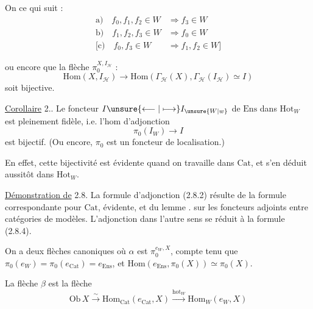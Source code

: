 On  ce qui suit :
\[
\begin{aligned}
\text{a)}\quad f_0,f_1,f_2\in W &\Longrightarrow f_3\in W\\
\text{b)}\quad f_1,f_2,f_3\in W &\Longrightarrow f_0\in W\\
\bigl[\text{c)}\quad f_0,f_3\in W &\Longrightarrow f_1,f_2\in W\bigr]
\end{aligned}
\]

ou encore que la flèche $\pi_0^{X,I_{\mathcal H}}$ :
\[
\mathrm{Hom}(X,I_{\mathcal H})\longrightarrow\mathrm{Hom}(\Gamma_{\mathcal H}(X),\Gamma_{\mathcal H}(I_{\mathcal H})\simeq I)
\]
soit bijective.

\uline{Corollaire} 2..  Le foncteur $I\unsure{\longleftarrow|\longmapsto}I_{\unsure{W|w}}$ de $\mathrm{Ens}$ dans $\mathrm{Hot}_W$ est pleinement fidèle, i.e. l'hom d'adjonction
\[
\pi_0(I_W)\longrightarrow I
\]
est bijectif. (Ou encore, $\pi_0$ est un foncteur de localisation.)

En effet, cette bijectivité est  évidente quand on travaille dans $\mathrm{Cat}$, et s'en déduit aussitôt  dans $\mathrm{Hot}_W$.

\uline{Démonstration de} 2.8. La formule d'adjonction (2.8.2) résulte de la formule correspondante pour $\mathrm{Cat}$, évidente, et du lemme . sur les foncteurs adjoints entre catégories de modèles. L'adjonction dans l'autre sens se réduit à la formule (2.8.4).

On a deux flèches canoniques
où $\alpha$ est $\pi_0^{e_W,X}$, compte tenu que $\pi_0(e_W)=\pi_0(e_{\mathrm{Cat}})=e_{\mathrm{Ens}}$, et $\mathrm{Hom}(e_{\mathrm{Ens}},\pi_0(X))\simeq\pi_0(X)$.

La flèche $\beta$ est  la flèche 
\[
\mathrm{Ob}\,X\xrightarrow{\sim}\mathrm{Hom}_{\mathrm{Cat}}(e_{\mathrm{Cat}},X)\xrightarrow{\mathrm{hot}_W}\mathrm{Hom}_W(e_W,X)
\]

